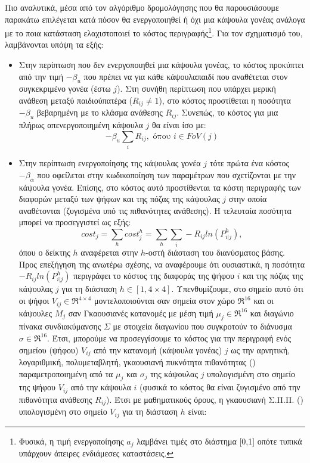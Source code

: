 Πιο αναλυτικά, μέσα από τον αλγόριθμο δρομολόγησης που θα παρουσιάσουμε παρακάτω επιλέγεται κατά πόσον θα ενεργοποιηθεί ή όχι μια κάψουλα γονέας ανάλογα με το ποια κατάσταση ελαχιστοποιεί το κόστος περιγραφής\footnote{Φυσικά, η τιμή ενεργοποίησης $a_j$ λαμβάνει τιμές στο διάστημα [0,1] οπότε τυπικά υπάρχουν άπειρες ενδιάμεσες καταστάσεις.}. Για τον σχηματισμό του, λαμβάνονται υπόψη τα εξής:
\begin{itemize}
  \item Στην περίπτωση που δεν ενεργοποιηθεί μια κάψουλα γονέας, το κόστος προκύπτει από την τιμή $-\beta_u$ που πρέπει να  για κάθε κάψουλα\textendash παιδί που αναθέτεται στον συγκεκριμένο γονέα (έστω $j$). Στη συνήθη περίπτωση που υπάρχει μερική ανάθεση μεταξύ παιδιού\textendash πατέρα ($R_{ij} \neq 1$), στο κόστος προστίθεται η ποσότητα $-\beta_u$ βεβαρημένη με το κλάσμα ανάθεσης $R_{ij}$. Συνεπώς, το κόστος για μια πλήρως απενεργοποιημένη κάψουλα $j$ θα είναι ίσο με:
  \begin{equation}
    -\beta_u \sum_i R_{ij}, \text{ όπου } i \in FoV(j) 
  \end{equation}
  \item Στην περίπτωση ενεργοποίησης της κάψουλας γονέα $j$ τότε  πρώτα ένα κόστος $-\beta_{\alpha}$ που οφείλεται στην κωδικοποίηση των παραμέτρων που σχετίζονται με την κάψουλα γονέα. Επίσης, στο κόστος αυτό προστίθενται τα κόστη περιγραφής των διαφορών μεταξύ των ψήφων και της πόζας της κάψουλας $j$ στην οποία αναθέτονται (ζυγισμένα υπό τις πιθανότητες ανάθεσης). Η τελευταία ποσότητα μπορεί να προσεγγιστεί ως εξής:
  \begin{equation}
    cost_j = \sum_h cost_j^h = \sum_h \sum_i -R_{ij}ln(P^h_{i|j}),
  \end{equation} όπου ο δείκτης $h$ αναφέρεται στην $h$-οστή διάσταση του διανύσματος βάσης.
  Προς επεξήγηση της ανωτέρω σχέσης, να αναφέρουμε ότι ουσιαστικά, η ποσότητα $-R_{ij}ln(P^h_{i|j})$ περιγράφει το κόστος της διαφοράς της ψήφου $i$ και της πόζας της κάψουλας $j$ για τη διάσταση $h \in [1,4\times 4]$. Υπενθυμίζουμε, στο σημείο αυτό ότι οι ψήφοι $V_{ij} \in \Re^{4 \times 4}$ μοντελοποιούνται σαν σημεία στον χώρο $\Re^16$ και οι κάψουλες $M_j$ σαν Γκαουσιανές κατανομές με μέση τιμή $\mu_j \in \Re^{16}$ και διαγώνιο πίνακα συνδιακύμανσης $\varSigma$ με στοιχεία διαγωνίου που συγκροτούν το διάνυσμα $\sigma \in \Re^{16}$. Έτσι, μπορούμε να προσεγγίσουμε το κόστος για την περιγραφή ενός σημείου (ψήφου) $V_{ij}$ από την κατανομή (κάψουλα γονέας) $j$ ως την αρνητική, λογαριθμική, πολυμεταβλητή, γκαουσιανή πυκνότητα πιθανότητας () παραμετροποιημένη από τα $\mu_j$ και $\sigma_j$ της κάψουλας $j$ υπολογισμένη στο σημείο της ψήφου $V_{ij}$ από την κάψουλα $i$ (φυσικά το κόστος θα είναι ζυγισμένο από την πιθανότητα ανάθεσης $R_{ij}$). Έτσι με μαθηματικούς όρους, η γκαουσιανή Σ.Π.Π. () υπολογισμένη στο σημείο $V_{ij}$ για τη διάσταση $h$ είναι:

\end{itemize}
